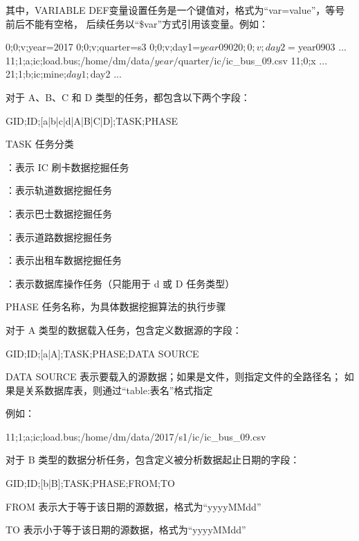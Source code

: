 其中，VARIABLE DEF变量设置任务是一个键值对，格式为“var=value”，等号前后不能有空格，
后续任务以“\${var}”方式引用该变量。例如：

\begin{examplecode}
0;0;v;year=2017
0;0;v;quarter=s3
0;0;v;day1=${year}0902
0;0;v;day2=${year}0903
...
11;1;a;ic;load.bus;/home/dm/data/${year}/${quarter}/ic/ic_bus_09.csv
11;0;x
...
21;1;b;ic;mine;${day1};${day2}
...
\end{examplecode}

对于 A、B、C 和 D 类型的任务，都包含以下两个字段：
\begin{scriptcode}
GID;ID;[a|b|c|d|A|B|C|D];TASK;PHASE
\end{scriptcode}

\begin{para}
\item [TASK] 任务分类
\begin{cit}
\item {}：表示 IC 刷卡数据挖掘任务
\item {}：表示轨道数据挖掘任务
\item {}：表示巴士数据挖掘任务
\item {}：表示道路数据挖掘任务
\item {}：表示出租车数据挖掘任务
\item {}：表示数据库操作任务（只能用于 d 或 D 任务类型）
\end{cit}
\item [PHASE] 任务名称，为具体数据挖掘算法的执行步骤
\end{para}

对于 A 类型的数据载入任务，包含定义数据源的字段：
\begin{scriptcode}
GID;ID;[a|A];TASK;PHASE;DATA SOURCE
\end{scriptcode}
\begin{para}
\item[DATA SOURCE] 表示要载入的源数据；如果是文件，则指定文件的全路径名；
如果是关系数据库表，则通过“table:表名”格式指定
\end{para}

例如：
\begin{examplecode}
11;1;a;ic;load.bus;/home/dm/data/2017/s1/ic/ic_bus_09.csv
\end{examplecode}

对于 B 类型的数据分析任务，包含定义被分析数据起止日期的字段：
\begin{scriptcode}
GID;ID;[b|B];TASK;PHASE;FROM;TO
\end{scriptcode}
\begin{para}
\item[FROM] 表示大于等于该日期的源数据，格式为“yyyyMMdd” 
\item[TO] 表示小于等于该日期的源数据，格式为“yyyyMMdd”
\end{para}

